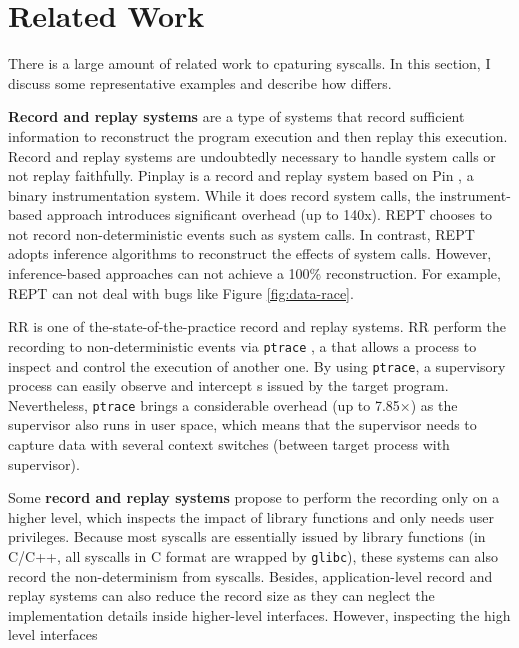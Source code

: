 \section{Related Work}

There is a large amount of related work to cpaturing syscalls. In this section, I discuss some representative examples and describe
how \TheName differs.

\textbf{Record and replay systems} are a type of systems that record sufficient information to reconstruct the program execution and then replay this execution. Record and replay systems are undoubtedly necessary to handle system calls or not replay faithfully.
Pinplay \cite{patil_pinplay_2010} is a record and replay system based on Pin  \cite{reddi_pin_2004}, a binary instrumentation system. While it does record system calls, the instrument-based approach introduces significant overhead (up to 140x). REPT \cite{cui_rept_2018} chooses to not record non-deterministic events such as system calls. In contrast, REPT adopts inference algorithms to reconstruct the effects of system calls. However, inference-based approaches can not achieve a 100\% reconstruction. For example, REPT can not deal with bugs like Figure \ref{fig:data-race}.

RR \cite{203227} is one of the-state-of-the-practice record and replay systems. RR perform the recording to non-deterministic events via \texttt{ptrace} \cite{ptrace2},
a \syscall{}
that allows a process to inspect and control the execution of another
one.
By using \texttt{ptrace}, a supervisory process can easily observe and intercept \syscall{}s issued by the target program.
Nevertheless,
\texttt{ptrace} brings a considerable overhead (up to 7.85×) as the supervisor also runs in
user space, 
which means that the supervisor needs to capture data with several
context switches (between target process with supervisor).

Some \textbf{record and replay systems} propose to perform the recording only on a higher level, which inspects the impact of library functions and only needs user privileges. Because most syscalls are essentially issued by library functions (in C/C++, all syscalls in C format are wrapped by \texttt{glibc}), these systems can also record the non-determinism from syscalls. Besides, application-level record and replay systems can also reduce the record size as they can neglect the implementation details inside higher-level interfaces. However, inspecting the high level interfaces 


